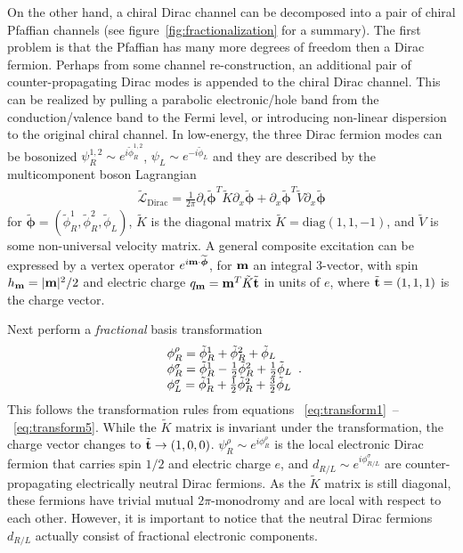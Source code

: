 On the other hand, a chiral Dirac channel can be decomposed into a pair of chiral Pfaffian channels (see figure~\ref{fig:fractionalization} for a summary). The first problem is that the Pfaffian has many more degrees of freedom then a Dirac fermion. Perhaps from some channel re-construction, an additional pair of counter-propagating Dirac modes is appended to the chiral Dirac channel. This can be realized by pulling a parabolic electronic/hole band from the conduction/valence band to the Fermi level, or introducing non-linear dispersion to the original chiral channel. In low-energy, the three Dirac fermion modes can be bosonized $\psi^{1,2}_R\sim e^{i\tilde\phi_R^{1,2}}$, $\psi_L\sim e^{-i\tilde\phi_L}$ and they are described by the multicomponent boson Lagrangian \begin{align}\widetilde{\mathcal{L}}_{\mathrm{Dirac}}=\frac{1}{2\pi}\partial_t\widetilde{\boldsymbol\phi}^T\tilde{K}\partial_x\widetilde{\boldsymbol\phi}+\partial_x\widetilde{\boldsymbol\phi}^T\tilde{V}\partial_x\widetilde{\boldsymbol\phi}\label{3Dirac}\end{align} for $\widetilde{\boldsymbol\phi}=(\tilde\phi_R^1,\tilde\phi_R^2,\tilde\phi_L)$, $\tilde{K}$ is the diagonal matrix $\tilde{K}=\mathrm{diag}(1,1,-1)$, and $\tilde{V}$ is some non-universal velocity matrix. A general composite excitation can be expressed by a vertex operator $e^{i{\bf m}\cdot\widetilde{\boldsymbol\phi}}$, for ${\bf m}$ an integral 3-vector, with spin $h_{\bf m}=|{\bf m}|^2/2$ and electric charge $q_{\bf m}={\bf m}^T\tilde{K}\tilde{\bf t}$ in units of $e$, where $\tilde{\bf t}=(1,1,1)$ is the charge vector.

Next perform a {\em fractional} basis transformation \begin{align}\begin{array}{*{20}l}\phi^\rho_R=\tilde\phi^1_R+\tilde\phi^2_R+\tilde\phi_L\\\phi^\sigma_R=\tilde\phi^1_R-\frac{1}{2}\tilde\phi^2_R+\frac{1}{2}\tilde\phi_L\\\phi^\sigma_L=\tilde\phi^1_R+\frac{1}{2}\tilde\phi^2_R+\frac{3}{2}\tilde\phi_L\end{array}.\label{fracbasistrans0}\end{align} This follows the transformation rules from equations ~\ref{eq:transform1}~--~\ref{eq:transform5}. While the $\tilde{K}$ matrix is invariant under the transformation, the charge vector changes to $\tilde{\bf t}\to(1,0,0)$. $\psi^\rho_R\sim e^{i\phi^\rho_R}$ is the local electronic Dirac fermion that carries spin $1/2$ and electric charge $e$, and $d_{R/L}\sim e^{i\phi^\sigma_{R/L}}$ are counter-propagating electrically neutral Dirac fermions. As the $\tilde{K}$ matrix is still diagonal, these fermions have trivial mutual $2\pi$-monodromy and are local with respect to each other. However, it is important to notice that the neutral Dirac fermions $d_{R/L}$ actually consist of fractional electronic components.

